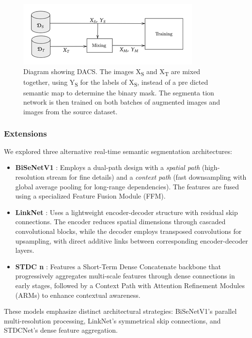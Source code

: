\documentclass{article}
\begin{document}
\begin{multicols}{2}
	\begin{figure}[H]
		\centering
		\includegraphics[width=1\linewidth]{image/general/DACS_structure.png}
		\caption{  Diagram showing DACS. The images X\textsubscript{S} and X\textsubscript{T} are
		mixed together, using Y\textsubscript{S} for the labels of X\textsubscript{S}, instead of a pre
	   dicted semantic map to determine the binary mask. The segmenta
	   tion network is then trained on both batches of augmented images
		and images from the source dataset.}
		\label{fig:DACS_image}
	\end{figure}	
	
		
		\subsubsection{Extensions}
		We explored three alternative real-time semantic segmentation architectures:
		\begin{itemize}
			\item \textbf{BiSeNetV1} \cite{yu2018bisenet}: Employs a dual-path design with a \textit{spatial path} (high-resolution stream for fine details) and a \textit{context path} (fast downsampling with global average pooling for long-range dependencies). The features are fused using a specialized Feature Fusion Module (FFM).
			\item \textbf{LinkNet} \cite{chaurasia2017linknet}: Uses a lightweight encoder-decoder structure with residual skip connections. The encoder reduces spatial dimensions through cascaded convolutional blocks, while the decoder employs transposed convolutions for upsampling, with direct additive links between corresponding encoder-decoder layers.
			\item \textbf{STDC n} \cite{fan2021rethinking}: Features a Short-Term Dense Concatenate backbone that progressively aggregates multi-scale features through dense connections in early stages, followed by a Context Path with Attention Refinement Modules (ARMs) to enhance contextual awareness.
		\end{itemize}
		These models emphasize distinct architectural strategies: BiSeNetV1's parallel multi-resolution processing, LinkNet's symmetrical skip connections, and STDCNet's dense feature aggregation.
		


\end{multicols}
\end{document}
